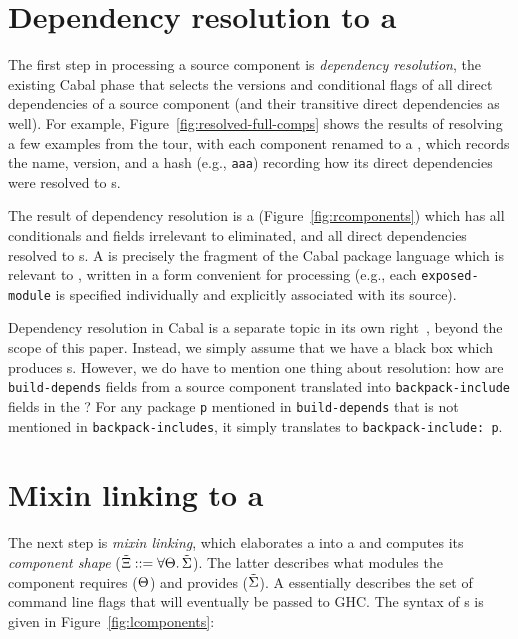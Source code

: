 \section{Dependency resolution to a \ccomp{}}

The first step in
processing a source component is \emph{dependency resolution},
the existing Cabal phase that
selects the versions and conditional flags of all direct dependencies of
a source component (and their transitive direct dependencies as well).
For example, Figure~\ref{fig:resolved-full-comps} shows the results
of resolving a few examples from the tour, with each component renamed to
a \cid{}, which records the name, version, and a hash (e.g., \verb|aaa|)
recording how its direct dependencies were resolved to \cid{}s.

The result of dependency resolution is a \emph{\ccomp}
(Figure~\ref{fig:rcomponents}) which has all conditionals and fields
irrelevant to \Backpack{} eliminated, and all direct dependencies
resolved to \cid{}s.  A \ccomp{} is precisely the fragment of the
Cabal package language which is relevant to \Backpack{}, written in a
form convenient for processing (e.g., each \verb|exposed-module| is
specified individually and explicitly associated with its source).

Dependency resolution in Cabal is a separate topic in its own
right~\cite{well-typed-solver, well-typed-qualified}, beyond the scope of this paper.
Instead, we simply assume that we have a black box which
produces \ccomp{}s.  However, we do have to mention one thing about resolution:
how are \verb|build-depends| fields from
a source component translated into \verb|backpack-include| fields in the
\ccomp{}?  For any package \verb|p|
mentioned in \verb|build-depends| that is not mentioned in
\verb|backpack-includes|, it simply translates to
\verb|backpack-include: p|.



\section{Mixin linking to a \unit{}}
\label{sec:overview-mixin}

The next step is \emph{mixin linking}, which 
elaborates a \ccomp{} into a \emph{\unit{}} and computes its
\emph{component shape} (${\tilde{\Xi}} ::= \forall \Theta.\, {\tilde{\Sigma}}$).
The latter describes what modules the
component requires ($\Theta$) and provides (${\tilde{\Sigma}}$).
A \unit{} essentially describes the set of command line flags that will
eventually be passed to GHC\@. The syntax of \unit{}s is given in
Figure~\ref{fig:lcomponents}:

